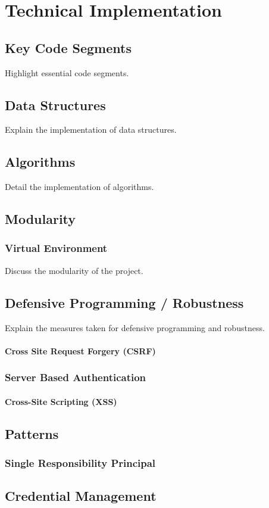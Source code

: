 \chapter{Technical Implementation}

\section{Key Code Segments}
Highlight essential code segments. 

\section{Data Structures}
Explain the implementation of data structures.

\section{Algorithms}
Detail the implementation of algorithms.

\section{Modularity}

\subsection{Virtual Environment}
Discuss the modularity of the project.

\section{Defensive Programming / Robustness}
Explain the measures taken for defensive programming and robustness.


\subsubsection{Cross Site Request Forgery (CSRF)}

\subsection{Server Based Authentication}
\subsubsection{Cross-Site Scripting (XSS)}


\section{Patterns}
\subsection{Single Responsibility Principal}


\section{Credential Management}